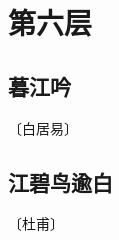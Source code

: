 \documentclass[12pt,UTF-8,openany]{ctexbook}
\begin{document}
\vspace{8pt}


\chapter{第六层}

\section{暮江吟}

\begin{center}
    \vspace{10pt}
    
    \begin{normalsize}
        
        〔白居易〕
        
    \end{normalsize}
    
    \vspace{8pt}
    
    \begin{large}
        
        
        
    \end{large}
    
\end{center}

\vspace{8pt}


\section{江碧鸟逾白}

\begin{center}
    \vspace{10pt}
    
    \begin{normalsize}
        
        〔杜甫〕
        
    \end{normalsize}
    
    \vspace{8pt}
    
    \begin{large}
        
        
        
    \end{large}
    
\end{center}
\end{document}
